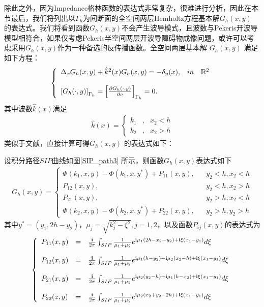 除此之外，因为Impedance格林函数的表达式非常复杂，很难进行分析，因此在本节最后，我们将列出以$\Gamma_h$为间断面的全空间两层Hemholtz方程基本解$G_h(x,y)$ 的表达式。我们将看到函数$G_h(x,y)$不会产生波导模式，且波数与Pekeris开波导模型相符合，如果仅考虑Pekeris半空间两层开波导障碍物成像问题，或许可以考虑采用$G_h(x,y)$作为一种备选的反传播函数。全空间两层基本解 $G_h(x,y)$ 满足如下方程：
\begin{eqnarray}
\left\{
\begin{array}{lll}
  \Delta_xG_h(x,y)+\hat k^2(x)G_h(x,y)=-\delta_y(x),& in& \mathbb{R}^2\\
  & &\\
  \left[G_h(\cdot,y)\right]_{\Gamma_h}=\left[\frac{\partial G_h(\cdot,y)}{\partial\nu}\right]_{\Gamma_h}=0.
    \end{array}
\right.
\end{eqnarray}
其中波数$\hat k(x)$满足
\begin{eqnarray*}
\hat k(x)=\left\{
\begin{array}{lll}
  k_1&,&x_2<h\\
  k_2&,&x_2>h
\end{array}
\right.
\end{eqnarray*}
类似于文献\cite{cz2010,Desanto1992Scalar,Ammari2005A}，直接计算可得$G_h(x,y)$ 的表达式如下：
\begin{lemma}\label{f_twolayer}
设积分路径$SIP$曲线如图\ref{SIP_path3} 所示，则函数$G_h(x,y)$表达式如下
\begin{eqnarray}
G_h(x,y)=\left\{
 \begin{array}{lll}
 \Phi(k_1,x,y)-\Phi(k_1,x,y^*)+P_{11}(x,y),& &y_2<h,x_2<h\\
 P_{12}(x,y),& &y_2<h,x_2>h\\
 P_{21}(x,y),& &y_2>h,x_2<h\\
 \Phi(k_2,x,y)-\Phi(k_2,x,y^*)+P_{22}(x,y),& &y_2>h,y_2>h
 \end{array}
 \right.
\end{eqnarray}
其中$y^*=(y_1,2h-y_2)$，$\mu_j=\sqrt{k_j^2-\xi^2}, j=1,2$，以及函数$P_{ij}(x,y)$的表达式为
\begin{eqnarray}
 \left\{
 \begin{array}{lll}
 P_{11}(x,y)&=&\frac{\mathbf{i}}{2\pi}\int_{SIP}\frac{1}{\mu_1+\mu_2}e^{\mathbf{i}\mu_1(2h-x_2-y_2)+\mathbf{i}\xi(x_1-y_1)}d\xi\\
 & &\\
 P_{12}(x,y)&=&\frac{\mathbf{i}}{2\pi}\int_{SIP}\frac{1}{\mu_1+\mu_2}e^{\mathbf{i}\mu_1(h-y_2)+\mathbf{i}\mu_2(x_2-h)+\mathbf{i}\xi(x_1-y_1)}d\xi\\
 & &\\
 P_{21}(x,y)&=&\frac{\mathbf{i}}{2\pi}\int_{SIP}\frac{1}{\mu_1+\mu_2}e^{\mathbf{i}\mu_2(y_2-h)+\mathbf{i}\mu_1(h-x_2)+\mathbf{i}\xi(x_1-y_1)}d\xi\\
 & &\\
 P_{22}(z,y)&=&\frac{\mathbf{i}}{2\pi}\int_{SIP}\frac{1}{\mu_1+\mu_2}e^{\mathbf{i}\mu_2(x_2+y_2-2h)+\mathbf{i}\xi(x_1-y_1)}d\xi
 \end{array}
 \right.
\end{eqnarray}
\end{lemma}

